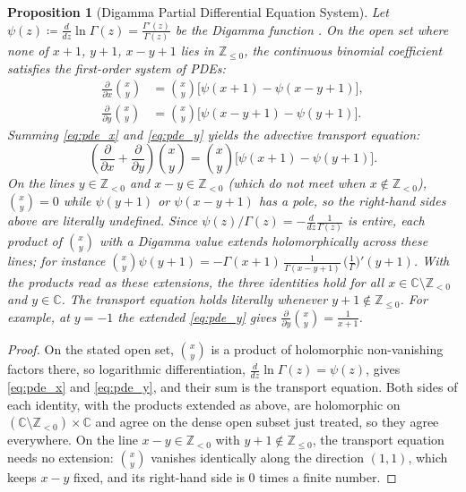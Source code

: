 \documentclass[11pt,a4paper]{article}
\theoremstyle{plain}
\newtheorem{proposition}[theorem]{Proposition}
\theoremstyle{definition}
\theoremstyle{remark}
\numberwithin{equation}{section}
\begin{document}
\begin{proposition}[Digamma Partial Differential Equation System]
\label{prop:digamma_pde}
Let $\psi(z) \coloneqq \frac{d}{dz}\ln \Gamma(z) = \frac{\Gamma'(z)}{\Gamma(z)}$ be the Digamma function \cite{olver1997}. On the open set where none of $x+1$, $y+1$, $x-y+1$ lies in $\mathbb{Z}_{\le 0}$, the continuous binomial coefficient satisfies the first-order system of PDEs:
\begin{align}
\frac{\partial}{\partial x}\binom{x}{y} &= \binom{x}{y}\Big[\psi(x+1) - \psi(x-y+1)\Big], \label{eq:pde_x}\\
\frac{\partial}{\partial y}\binom{x}{y} &= \binom{x}{y}\Big[\psi(x-y+1) - \psi(y+1)\Big]. \label{eq:pde_y}
\end{align}
Summing \eqref{eq:pde_x} and \eqref{eq:pde_y} yields the advective transport equation:
\begin{equation}
\left(\frac{\partial}{\partial x} + \frac{\partial}{\partial y}\right)\binom{x}{y} = \binom{x}{y}\Big[\psi(x+1) - \psi(y+1)\Big].
\end{equation}
On the lines $y \in \mathbb{Z}_{<0}$ and $x - y \in \mathbb{Z}_{<0}$ (which do not meet when $x \notin \mathbb{Z}_{<0}$), $\binom{x}{y} = 0$ while $\psi(y+1)$ or $\psi(x-y+1)$ has a pole, so the right-hand sides above are literally undefined. Since $\psi(z)/\Gamma(z) = -\frac{d}{dz}\frac{1}{\Gamma(z)}$ is entire, each product of $\binom{x}{y}$ with a Digamma value extends holomorphically across these lines; for instance $\binom{x}{y}\psi(y+1) = -\Gamma(x+1)\,\frac{1}{\Gamma(x-y+1)}\,\big(\tfrac{1}{\Gamma}\big)'(y+1)$. With the products read as these extensions, the three identities hold for all $x \in \mathbb{C} \setminus \mathbb{Z}_{<0}$ and $y \in \mathbb{C}$. The transport equation holds literally whenever $y+1 \notin \mathbb{Z}_{\le 0}$. For example, at $y = -1$ the extended \eqref{eq:pde_y} gives $\frac{\partial}{\partial y}\binom{x}{y} = \frac{1}{x+1}$.
\end{proposition}
\begin{proof}
On the stated open set, $\binom{x}{y}$ is a product of holomorphic non-vanishing factors there, so logarithmic differentiation, $\frac{d}{dz}\ln\Gamma(z) = \psi(z)$, gives \eqref{eq:pde_x} and \eqref{eq:pde_y}, and their sum is the transport equation. Both sides of each identity, with the products extended as above, are holomorphic on $(\mathbb{C} \setminus \mathbb{Z}_{<0}) \times \mathbb{C}$ and agree on the dense open subset just treated, so they agree everywhere. On the line $x - y \in \mathbb{Z}_{<0}$ with $y+1 \notin \mathbb{Z}_{\le 0}$, the transport equation needs no extension: $\binom{x}{y}$ vanishes identically along the direction $(1,1)$, which keeps $x-y$ fixed, and its right-hand side is $0$ times a finite number.
\end{proof}
\end{document}

